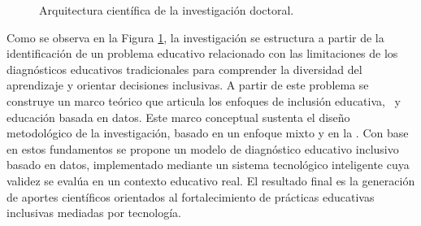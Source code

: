 \begin{refsection}
\begin{figure}[htbp]
{}
\caption{Arquitectura científica de la investigación doctoral.}
\label{fig:arquitectura-investigacion}
\end{figure}

Como se observa en la Figura \ref{fig:arquitectura-investigacion}, la investigación se estructura a partir de la identificación de un problema educativo relacionado con las limitaciones de los diagnósticos educativos tradicionales para comprender la diversidad del aprendizaje y orientar decisiones inclusivas. A partir de este problema se construye un marco teórico que articula los enfoques de inclusión educativa, \DUA\ y educación basada en datos. Este marco conceptual sustenta el diseño metodológico de la investigación, basado en un enfoque mixto y en la \DBR. Con base en estos fundamentos se propone un modelo de diagnóstico educativo inclusivo basado en datos, implementado mediante un sistema tecnológico inteligente cuya validez se evalúa en un contexto educativo real. El resultado final es la generación de aportes científicos orientados al fortalecimiento de prácticas educativas inclusivas mediadas por tecnología.

\printbibliography[heading=subbibliography,title={Referencias (Capítulo I)}]

\end{refsection}